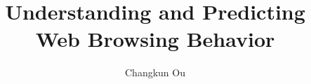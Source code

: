 \documentclass[11pt,a4paper,twoside]{article}
\title{Understanding and Predicting\\Web Browsing Behavior}
\author{Changkun Ou}
\begin{document}
\makecover
\makeaufgabenstellung
\makededication
\makeabstract
\maketoc
\cleardoublepage












\end{document}
